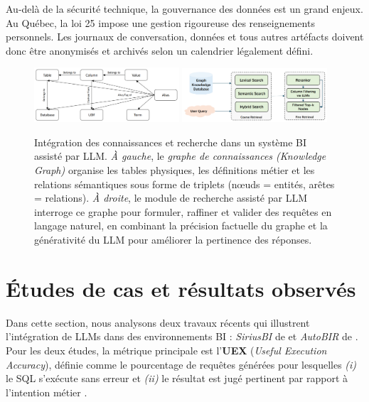 \documentclass[conference]{IEEEtran}
\begin{document}
Au-delà de la sécurité technique, la gouvernance des données est un grand enjeux. Au Québec, la loi 25 impose une gestion rigoureuse des renseignements personnels. Les journaux de conversation, données et tous autres artéfacts doivent donc être anonymisés et archivés selon un calendrier légalement défini. 

\begin{figure}
    \centering
    \includegraphics[width=0.48\textwidth]{figures/knowledge_graph.png} \hfill
    \includegraphics[width=0.48\textwidth]{figures/knowledge_retreival.png}
    \caption{Intégration des connaissances et recherche dans un système BI assisté par LLM. \emph{À gauche}, le \textit{graphe de connaissances (Knowledge Graph)} organise les tables physiques, les définitions métier et les relations sémantiques sous forme de triplets (nœuds = entités, arêtes = relations). \emph{À droite}, le module de recherche assisté par LLM interroge ce graphe pour formuler, raffiner et valider des requêtes en langage naturel, en combinant la précision factuelle du graphe et la générativité du LLM pour améliorer la pertinence des réponses.}
    \label{fig:knowledge-components}
\end{figure}

\section{Études de cas et résultats observés}
\label{sec:cas_etudes}

Dans cette section, nous analysons deux travaux récents qui illustrent l’intégration de LLMs dans des environnements BI : \emph{SiriusBI} de \cite{jiang2024siriusbi} et \emph{AutoBIR} de \cite{busany2024autobir}. Pour les deux études, la métrique principale est l’\textbf{UEX} (\emph{Useful Execution Accuracy}), définie comme le pourcentage de requêtes générées pour lesquelles \emph{(i)} le SQL s’exécute sans erreur et \emph{(ii)} le résultat est jugé pertinent par rapport à l’intention métier \cite{jiang2024siriusbi}.  
\end{document}
